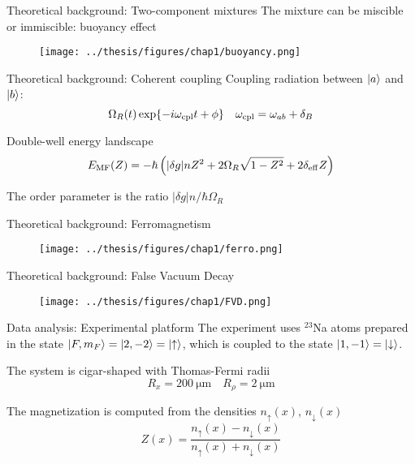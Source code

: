\documentclass[handout]{beamer}
\begin{document}
\begin{frame}{Theoretical background: Two-component mixtures}
    The mixture can be miscible or immiscible: buoyancy effect
    \begin{figure}
        \centering
        \texttt{[image: ../thesis/figures/chap1/buoyancy.png]}
    \end{figure}
\end{frame}

\begin{frame}{Theoretical background: Coherent coupling}
    Coupling radiation between $\ket{a}$ and $\ket{b}$:
    \[
        \Omega_R(t)\exp{-i\omega_{\rm cpl}t+\phi} \quad \omega_{\rm cpl} = \omega_{ab} + \delta_B
    \]

    Double-well energy landscape
    \begin{equation*}
        E_{\rm MF}(Z) = -\hbar\left(|\delta g|n Z^2 + 2\Omega_R \sqrt{1-Z^2} + 2\delta_{\rm eff} Z\right)
        \label{eq:E_MF}
    \end{equation*}

    The order parameter is the ratio $|\delta g|n/\hbar\Omega_R$
\end{frame}

\begin{frame}{Theoretical background: Ferromagnetism}
    \begin{figure}
        \centering
        \texttt{[image: ../thesis/figures/chap1/ferro.png]}
    \end{figure}
\end{frame}

\begin{frame}{Theoretical background: False Vacuum Decay}
    \begin{figure}
        \centering
        \texttt{[image: ../thesis/figures/chap1/FVD.png]}
    \end{figure}    
\end{frame}

\begin{frame}{Data analysis: Experimental platform}
    The experiment uses $^{23}$Na atoms prepared in the state $\ket{F,m_F} = \ket{2, -2} = \ket{\uparrow}$, which is coupled to the state $\ket{1, -1} = \ket{\downarrow}$.

    The system is cigar-shaped with Thomas-Fermi radii 
    \begin{equation*}
        R_x = 200\ \unit{\micro\meter} \quad R_\rho = 2\ \unit{\micro\meter}
    \end{equation*}

    The magnetization is computed from the densities $n_\uparrow(x)$, $n_\downarrow(x)$
    \begin{equation*}
        Z(x) = \frac{n_\uparrow(x) - n_\downarrow(x)}{n_\uparrow(x) + n_\downarrow(x)}
    \end{equation*}
\end{frame}
\end{document}

